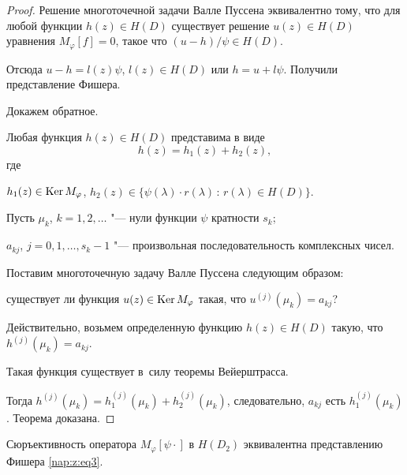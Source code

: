 \smallskip



\begin{proof}

Решение многоточечной задачи Валле Пуссена эквивалентно тому, что для любой функции $h(z)\in H(D)$ существует решение $u(z)\in H(D)$ уравнения $M_\varphi[f]=0$, такое что $({u-h})/{\psi}\in H(D)$. 

Отсюда $u-h=l(z)\psi$, $l(z)\in H(D)$ или $h=u+l\psi$. Получили представление Фишера.



Докажем обратное. 

Любая функция $h(z)\in H(D)$ представима в виде $$h(z)=h_1(z)+h_2(z),$$ где 

$h_1(z)\in \mathop{\rm Ker} M_\varphi$, $h_2(z)\in \{\psi (\lambda)\cdot r(\lambda) \,: \,r(\lambda)\in H(D)\}.$ 

Пусть $\mu_k$, $k=1, 2, \dots$ "--- нули функции $\psi $ кратности $s_k$; 

$a_{kj}$, $j=0, 1, \dots, s_k-1$ "--- произвольная последовательность комплексных чисел. 

Поставим многоточечную задачу Валле Пуссена следующим образом: 

существует ли функция $u(z)\in \mathop{\rm Ker}M_\varphi$ такая, что $u^{(j)}(\mu_k)=a_{kj}$?

Действительно, возьмем определенную функцию $h(z)\in H(D)$ такую, что $h^{(j)}(\mu_k)=a_{kj}$. 

Такая функция существует в~силу теоремы Вейерштрасса. 

Тогда  $h^{(j)}(\mu_k)=h_1^{(j)}(\mu_k)+h_2^{(j)}(\mu_k)$, следовательно, $a_{kj}$ есть $h_1^{(j)}(\mu_k)$. Теорема доказана.

\end{proof}



\smallskip




\hypertarget{nap:z:l1}{}

\begin{lemma}[1]Сюръективность оператора $M_\varphi[\psi \cdot]$ в $H(D_2)$ эквивалентна представлению Фишера \rm \eqref{nap:z:eq3}. 

\end{lemma}



\smallskip



